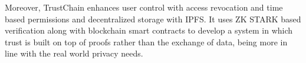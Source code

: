 Moreover, TrustChain enhances user control with access revocation and time based permissions and decentralized storage with IPFS. It uses ZK STARK based verification along with blockchain smart contracts to develop a system in which trust is built on top of proofs rather than the exchange of data, being more in line with the real world privacy needs.\\





